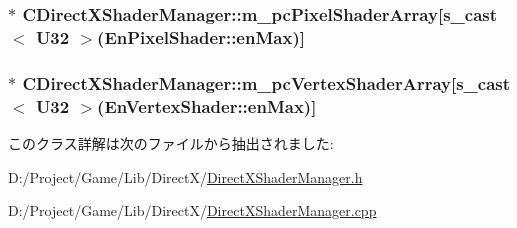\subsubsection[{m\+\_\+pc\+Pixel\+Shader\+Array}]{$\ast$ C\+Direct\+X\+Shader\+Manager\+::m\+\_\+pc\+Pixel\+Shader\+Array\mbox{[}{\bf s\+\_\+cast}$<$ U32 $>$({\bf En\+Pixel\+Shader\+::en\+Max})\mbox{]}\hspace{0.3cm}{\ttfamily [private]}}\label{class_c_direct_x_shader_manager_a2f6249831a45357aaa133c615603a54b}
\hypertarget{class_c_direct_x_shader_manager_ac5f58343fb18d284ddd799f5728d29aa}{}
\subsubsection[{m\+\_\+pc\+Vertex\+Shader\+Array}]{$\ast$ C\+Direct\+X\+Shader\+Manager\+::m\+\_\+pc\+Vertex\+Shader\+Array\mbox{[}{\bf s\+\_\+cast}$<$ U32 $>$({\bf En\+Vertex\+Shader\+::en\+Max})\mbox{]}\hspace{0.3cm}{\ttfamily [private]}}\label{class_c_direct_x_shader_manager_ac5f58343fb18d284ddd799f5728d29aa}


このクラス詳解は次のファイルから抽出されました\+:\begin{DoxyCompactItemize}
\item 
D\+:/\+Project/\+Game/\+Lib/\+Direct\+X/\hyperlink{_direct_x_shader_manager_8h}{Direct\+X\+Shader\+Manager.\+h}\item 
D\+:/\+Project/\+Game/\+Lib/\+Direct\+X/\hyperlink{_direct_x_shader_manager_8cpp}{Direct\+X\+Shader\+Manager.\+cpp}\end{DoxyCompactItemize}
